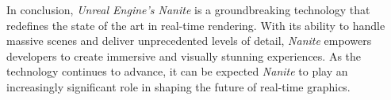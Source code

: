 \documentclass[10pt,journal,compsoc]{IEEEtran}
\begin{document}
\par In conclusion, \textit{Unreal Engine's Nanite} is a groundbreaking technology that redefines the state of the art in real-time rendering. With its ability to handle massive scenes and deliver unprecedented levels of detail, \textit{Nanite} empowers developers to create immersive and visually stunning experiences. As the technology continues to advance, it can be expected \textit{Nanite} to play an increasingly significant role in shaping the future of real-time graphics.

\newpage


\end{document}
